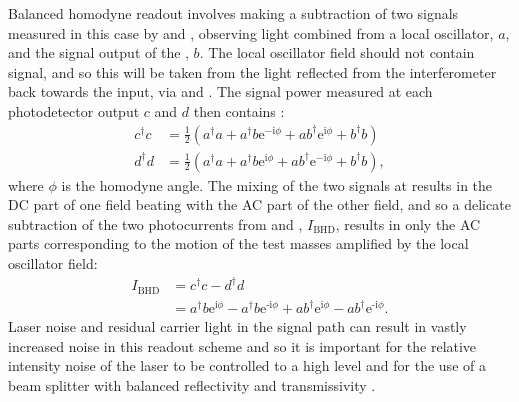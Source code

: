 Balanced homodyne readout involves making a subtraction of two signals measured in this case by \HDA{} and \HDB{}, observing light combined from a local oscillator, $a$, and the signal output of the \SSM{}, $b$. The local oscillator field should not contain signal, and so this will be taken from the light reflected from the interferometer back towards the input, via \MTWELVE{} and \MTHIRTEEN{}. The signal power measured at each photodetector output $c$ and $d$ then contains \cite{Steinlechner2015}:
\begin{equation}
  \begin{split}
    c^{\dag} c &= \frac{1}{2} \left( a^{\dag} a + a^{\dag} b \text{e}^{-\text{i} \phi} + a b^{\dag} \text{e}^{\text{i} \phi} + b^{\dag} b \right) \\
    d^{\dag} d &= \frac{1}{2} \left( a^{\dag} a + a^{\dag} b \text{e}^{\text{i} \phi} + a b^{\dag} \text{e}^{-\text{i} \phi} + b^{\dag} b \right),
  \end{split}
\end{equation}
where $\phi$ is the homodyne angle. The mixing of the two signals at \MSIXTEEN{} results in the \gls{DC} part of one field beating with the \gls{AC} part of the other field, and so a delicate subtraction of the two photocurrents from \HDA{} and \HDB{}, $I_{\text{BHD}}$, results in only the \gls{AC} parts corresponding to the motion of the test masses amplified by the local oscillator field:
\begin{equation}
  \begin{split}
    I_{\text{BHD}} &= c^{\dag} c - d^{\dag} d \\
                   &= a^{\dag} b \text{e}^{\text{i} \phi} - a^{\dag} b \text{e}^{\text{-i} \phi} + a b^{\dag} \text{e}^{\text{i} \phi} - a b^{\dag} \text{e}^{\text{-i} \phi}.
  \end{split}
\end{equation}
Laser noise and residual carrier light in the signal path can result in vastly increased noise in this readout scheme and so it is important for the relative intensity noise of the laser to be controlled to a high level and for the use of a beam splitter with balanced reflectivity and transmissivity \cite{Steinlechner2015}.

